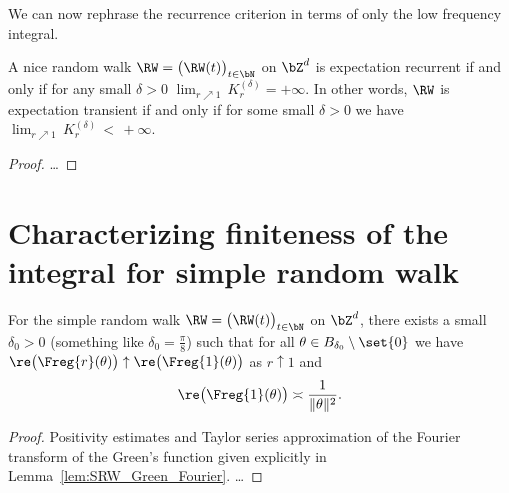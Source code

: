 We can now rephrase the recurrence criterion in terms of only the low frequency integral.

\begin{lemma}
  \label{lem:recurrence_iff_finite_low_frequency}
  A nice random walk $\RW = \big(\RW(t)\big)_{t \in \bN}$ on $\bZ^d$
  is expectation recurrent if and only if for any small $\delta>0$
  $\lim_{r \nearrow 1} \, K_r^{(\delta)} = +\infty$.
  In other words, $\RW$ is expectation transient if and only if
  for some small $\delta>0$ we have $\lim_{r \nearrow 1} \, K_r^{(\delta)} \, < \, +\infty$.
\end{lemma}
\begin{proof}
\ldots
\end{proof}


\section{Characterizing finiteness of the integral for simple random walk}

\begin{lemma}
  \label{lem:SRW_low_frequency_approximation}
  For the simple random walk $\RW = \big(\RW(t)\big)_{t \in \bN}$ on $\bZ^d$,
  there exists a small $\delta_0 > 0$
  (something like $\delta_0 = \frac{\pi}{8}$) such that
  for all $\theta \in B_{\delta_0} \setminus \set{0}$
  we have $\re \big( \Freg{r}(\theta) \big) \uparrow \re \big( \Freg{1}(\theta) \big)$
  as $r \uparrow 1$ and
  \begin{align*}
  \re \big( \Freg{1}(\theta) \big) \asymp \frac{1}{\| \theta \|^{2}} .
  \end{align*}
\end{lemma}
\begin{proof}
Positivity estimates and Taylor series approximation of the Fourier
transform of the Green's function given explicitly in
Lemma~\ref{lem:SRW_Green_Fourier}. \ldots
\end{proof}

